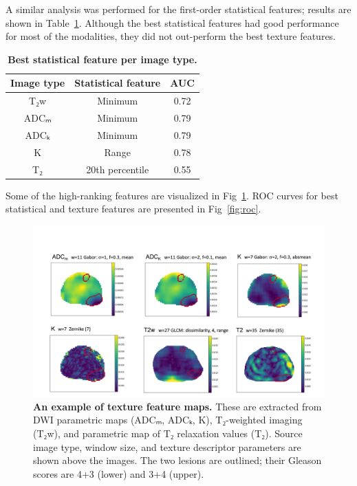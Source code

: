A similar analysis was performed for the first-order statistical features;
results are shown in Table~\ref{tab:stats_imagetype}. Although the best
statistical features had good performance for most of the modalities, they did
not out-perform the best texture features.

\begin{table}[!h]
\centering
\caption{{\bf Best statistical feature per image type.}}%
\label{tab:stats_imagetype}

\begin{tabular}{c c c}
\hline
Image type & Statistical feature & AUC \\
\hline
T₂w & Minimum & 0.72 \\
ADCₘ & Minimum & 0.79 \\
ADCₖ & Minimum & 0.79 \\
K & Range & 0.78 \\
T₂ & 20th percentile & 0.55 \\
\hline
\end{tabular}
\end{table}

Some of the high-ranking features are visualized in Fig~\ref{fig:tmap}. ROC
curves for best statistical and texture features are presented in
Fig~\ref{fig:roc}.

\begin{figure}[!ht]
    \centering
    \includegraphics[width=1.0\textwidth]{figures/fig3}
    \caption{{\bf An example of texture feature maps.}
    These are extracted from DWI parametric maps (ADCₘ, ADCₖ, K), T₂-weighted
    imaging (T₂w), and parametric map of T₂ relaxation values (T₂). Source image
    type, window size, and texture descriptor parameters are shown above the
    images. The two lesions are outlined; their Gleason scores are 4+3 (lower)
    and 3+4 (upper).}%
    \label{fig:tmap}
\end{figure}


